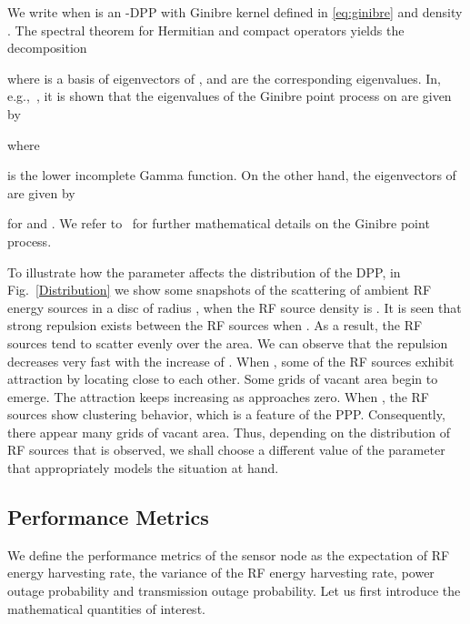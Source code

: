 \documentclass[12pt,draftclsnofoot,onecolumn]{IEEEtran}
\begin{document}
 We write  
 when  is an -DPP with Ginibre
 kernel defined in \eqref{eq:ginibre} and density . 
The spectral theorem for Hermitian and compact operators 
 yields the decomposition 

where  is a basis of eigenvectors of , and  are the corresponding eigenvalues. 
In, e.g.,~\cite{DecreusefondFlintVergne}, it is shown that
 the eigenvalues of the Ginibre point process on  
 are given by 

 where 

 is the lower incomplete Gamma function. 
 On the other hand, the eigenvectors of  are given by

for  and .
We refer to~\cite{DecreusefondFlintVergne} for 
further mathematical details on the Ginibre point process. 

To illustrate how the parameter  affects the distribution of the DPP, in Fig.~\ref{Distribution} we show some snapshots of the scattering of ambient RF energy sources in a disc of radius , when the RF source density is . It is seen that strong repulsion exists between the RF sources when . As a result, the RF sources tend to scatter evenly over the area. We can observe that the repulsion decreases very fast with the increase of . When , some of the RF sources exhibit attraction by locating close to each other. Some grids of vacant area begin to emerge. The attraction
keeps increasing as  approaches zero. When , the RF sources show clustering behavior, which is a feature of the PPP. Consequently, there appear many grids of vacant area. Thus, depending on the distribution of RF sources that is observed, we shall choose a different value of the parameter  that appropriately models the situation at hand. 

\begin{figure*}[t]
\begin{center}

\caption{Snapshots of the distribution of ambient RF energy sources (a)  (b)  (c) .}
\label{Distribution}
\end{center}
\end{figure*} 

\subsection{Performance Metrics}
\label{sec:metrics}

We define the performance metrics of the sensor node as the expectation of RF energy harvesting rate, the variance of the RF energy harvesting rate, power outage probability and transmission outage probability. Let us first introduce the mathematical quantities of interest.
\end{document}
